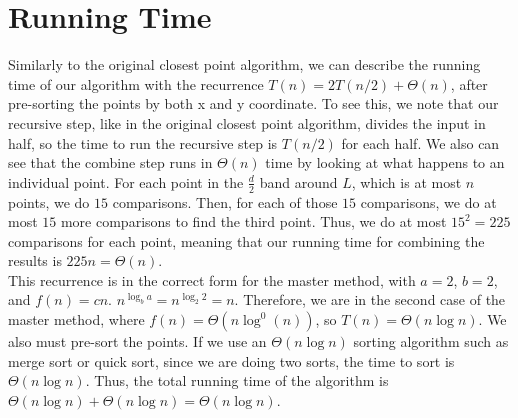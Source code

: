 \documentclass[12pt]{article}
\begin{document}
\section*{Running Time}
Similarly to the original closest point algorithm, we can describe the running time of our algorithm with the recurrence $T(n) = 2T(n/2) + \Theta(n)$, after pre-sorting the points by both x and y coordinate. To see this, we note that our recursive step, like in the original closest point algorithm, divides the input in half, so the time to run the recursive step is $T(n/2)$ for each half. We also can see that the combine step runs in $\Theta(n)$ time by looking at what happens to an individual point. For each point in the $\frac{d}{2}$ band around $L$, which is at most $n$ points, we do $15$ comparisons. Then, for each of those $15$ comparisons, we do at most $15$ more comparisons to find the third point. Thus, we do at most $15^2 = 225$ comparisons for each point, meaning that our running time for combining the results is $225n = \Theta(n)$. \\
This recurrence is in the correct form for the master method, with $a = 2$, $b = 2$, and $f(n) = cn$. $n^{\log_b a} = n^{\log_2 2} = n$. Therefore, we are in the second case of the master method, where $f(n) = \Theta(n \log^0(n))$, so $T(n) = \Theta(n \log n)$. We also must pre-sort the points. If we use an $\Theta(n \log n)$ sorting algorithm such as merge sort or quick sort, since we are doing two sorts, the time to sort is $\Theta(n \log n)$. Thus, the total running time of the algorithm is $\Theta(n \log n) + \Theta(n \log n) = \Theta(n \log n)$.
\end{document}
